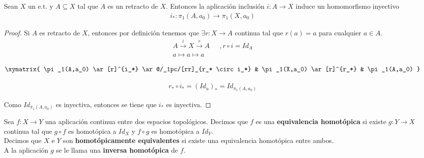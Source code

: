 \begin{lema}
    Sean $X$ un e.t. y $A\subseteq X$ tal que $A$ es un retracto de $X$. Entonces la aplicación inclusión $i:A\to X$ induce un homomorfismo inyectivo
    \begin{gather*}
        i_* : \pi_1(A, a_0) \to \pi_1(X,a_0)
    \end{gather*}

    \begin{proof}
        Si $A$ es retracto de $X$, entonces por definición tenemos que  $\exists r :X \to A$ continua tal que $r(a)=a$ para cualquier $a\in A$.
        \begin{align*}
            A \overset{i}{\longrightarrow} X \overset{r}{\longrightarrow} A& \ \ \ ,r\circ i = Id_A\\
            a \longmapsto a  \longmapsto a&
        \end{align*}

        \begin{gather*}
            \xymatrix{
                \pi_1(A,a_0) \ar[r]^{i_*} \ar@/_1pc/[rr]_{r_* \circ i_*} &
                \pi_1(X,a_0) \ar[r]^{r_*} &
                \pi_1(A,a_0)
            }
        \end{gather*}

        \begin{gather*}
            r_* \circ i_* = (Id_a)_* = Id_{\pi_1(A,a_0)}
        \end{gather*}
            
        Como $Id_{\pi_1(A,a_0)}$ es inyectiva, entonces se tiene que $i_*$ es inyectiva.
    \end{proof}
\end{lema}

\begin{definicion}
    Sea $f:X\to Y$ una aplicación continua entre dos espacios topológicos. Decimos que $f$ es una \textbf{equivalencia homotópica} si existe $g:Y\to X$ continua tal que $g\circ f$ es homotópica a $Id_X$ y $f\circ g$ es homotópica a $Id_Y$.\\

    Decimos que $X$ e $Y$ son \textbf{homotópicamente equivalentes} si existe una equivalencia homotópica entre ambos.\\

    A la aplicación $g$ se le llama una \textbf{inversa homotópica} de $f$.
\end{definicion}

